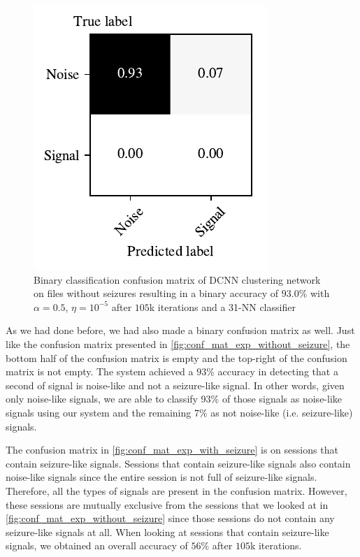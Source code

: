 \begin{figure}[!ht]
	\centering
	\includegraphics[width=0.425\linewidth]{pictures/conf_mat_exp_without_seizure_pooled.pdf}
	\caption[Binary Confusion Matrix on Sessions without Seizure-Like Signals]{Binary classification confusion matrix of DCNN clustering network on files without seizures resulting in a binary accuracy of $93.0\%$ with $\alpha = 0.5$, $\eta = 10^{-5}$ after $105$k iterations and a 31-NN classifier}\label{fig:conf_mat_exp_without_seizure_pooled}  
\end{figure}

As we had done before, we had also made a binary confusion matrix as well. Just like the confusion matrix presented in \cref{fig:conf_mat_exp_without_seizure}, the bottom half of the confusion matrix is empty and the top-right of the confusion matrix is not empty. The system achieved a $93\%$ accuracy in detecting that a second of signal is noise-like and not a seizure-like signal. In other words, given only noise-like signals, we are able to classify 93\% of those signals as noise-like signals using our system and the remaining 7\% as not noise-like (i.e. seizure-like) signals. 

The confusion matrix in \cref{fig:conf_mat_exp_with_seizure} is on sessions that contain seizure-like signals. Sessions that contain seizure-like signals also contain noise-like signals since the entire session is not full of seizure-like signals. Therefore, all the types of signals are present in the confusion matrix. However, these sessions are mutually exclusive from the sessions that we looked at in \cref{fig:conf_mat_exp_without_seizure} since those sessions do not contain any seizure-like signals at all. When looking at sessions that contain seizure-like signals, we obtained an overall accuracy of $56\%$ after $105$k iterations.

